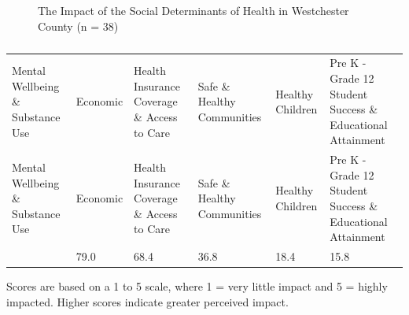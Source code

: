 \documentclass[
  english,
  letterpaper,
]{report}
\begin{document}
\begin{figure}


\caption{\label{fig-wc-impact-sdoh}The Impact of the Social Determinants
of Health in Westchester County (n = 38)}

\end{figure}%

\begin{longtable}[]{@{}llllll@{}}

\caption{\label{tbl-wc-impact-sdoh}The Impact of the Social Determinants
of Health in Westchester County (n = 38)}

\tabularnewline

\caption{}\label{T_d7fda}\tabularnewline
\toprule\noalign{}
Mental Wellbeing \& Substance Use & Economic & Health Insurance Coverage
\& Access to Care & Safe \& Healthy Communities & Healthy Children & Pre
K - Grade 12 Student Success \& Educational Attainment \\
\midrule\noalign{}
\endfirsthead
\toprule\noalign{}
Mental Wellbeing \& Substance Use & Economic & Health Insurance Coverage
\& Access to Care & Safe \& Healthy Communities & Healthy Children & Pre
K - Grade 12 Student Success \& Educational Attainment \\
\midrule\noalign{}
\endhead
\bottomrule\noalign{}
\endlastfoot
81.6 & 79.0 & 68.4 & 36.8 & 18.4 & 15.8 \\

\end{longtable}

\begin{tcolorbox}[enhanced jigsaw, breakable, leftrule=.75mm, title=\textcolor{quarto-callout-note-color}{\faInfo}\hspace{0.5em}{Note}, bottomrule=.15mm, opacityback=0, left=2mm, colback=white, bottomtitle=1mm, coltitle=black, colbacktitle=quarto-callout-note-color!10!white, colframe=quarto-callout-note-color-frame, opacitybacktitle=0.6, toptitle=1mm, titlerule=0mm, arc=.35mm, rightrule=.15mm, toprule=.15mm]

Scores are based on a 1 to 5 scale, where 1 = very little impact and 5 =
highly impacted. Higher scores indicate greater perceived impact.

\end{tcolorbox}
\end{document}
